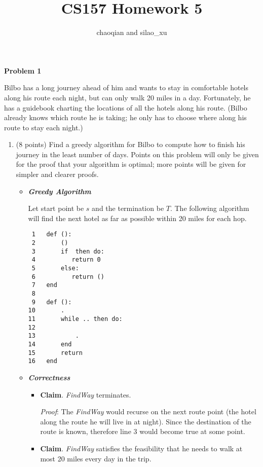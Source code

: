 \documentclass{letter}
\newcommand{\section}[1]{\medskip\bigskip

\noindent\textbf{\LARGE #1}}
\newcommand{\tmstrong}[1]{\textbf{#1}}
\newcommand{\tmtextit}[1]{{\itshape{#1}}}
\newenvironment{enumeratenumeric}{\begin{enumerate}[1.] }{\end{enumerate}}
\newenvironment{itemizedot}{\begin{itemize} \renewcommand{\labelitemi}{$\bullet$}\renewcommand{\labelitemii}{$\bullet$}\renewcommand{\labelitemiii}{$\bullet$}\renewcommand{\labelitemiv}{$\bullet$}}{\end{itemize}}
\newenvironment{itemizeminus}{\begin{itemize} \renewcommand{\labelitemi}{$-$}\renewcommand{\labelitemii}{$-$}\renewcommand{\labelitemiii}{$-$}\renewcommand{\labelitemiv}{$-$}}{\end{itemize}}
\begin{document}
\title{CS157 Homework 5}\author{chaoqian and silao\_xu}\maketitle

\section{Problem 1}

Bilbo has a long journey ahead of him and wants to stay in comfortable hotels
along his route each night, but can only walk 20 miles in a day. Fortunately,
he has a guidebook charting the locations of all the hotels along his route.
(Bilbo already knows which route he is taking; he only has to choose where
along his route to stay each night.)
\begin{enumeratenumeric}
  \item (8 points) Find a greedy algorithm for Bilbo to compute how to finish
  his journey in the least number of days. Points on this problem will only be
  given for the proof that your algorithm is optimal; more points will be
  given for simpler and clearer proofs.
  \begin{itemizedot}
    \item \tmtextit{{\tmstrong{Greedy Algorithm}}}
    
    Let start point be $s$ and the termination be $T$. The following algorithm
    will find the next hotel as far as possible within 20 miles for each hop.
    \begin{verbatim}
 1   def ():
 2       ()
 3       if  then do:
 4          return 0
 5       else:
 6          return ()
 7   end
 8
 9   def ():
10       .
11       while .. then do:
12           
13           .
14       end
15       return 
16   end
\end{verbatim}
    \item {\tmstrong{\tmtextit{Correctness}}}
    \begin{itemizeminus}
      \item {\tmstrong{Claim}}. \tmtextit{FindWay} terminates.
      
      \tmtextit{Proof}: The \tmtextit{FindWay} would recurse on the next route
      point (the hotel along the route he will live in at night). Since the
      destination of the route is known, therefore line 3 would become true at
      some point.
      
      \item {\tmstrong{Claim}}. \tmtextit{FindWay} satisfies the feasibility
      that he needs to walk at most 20 miles every day in the trip.
      

\end{itemizeminus}
\end{itemizedot}
\end{enumeratenumeric}
\end{document}
